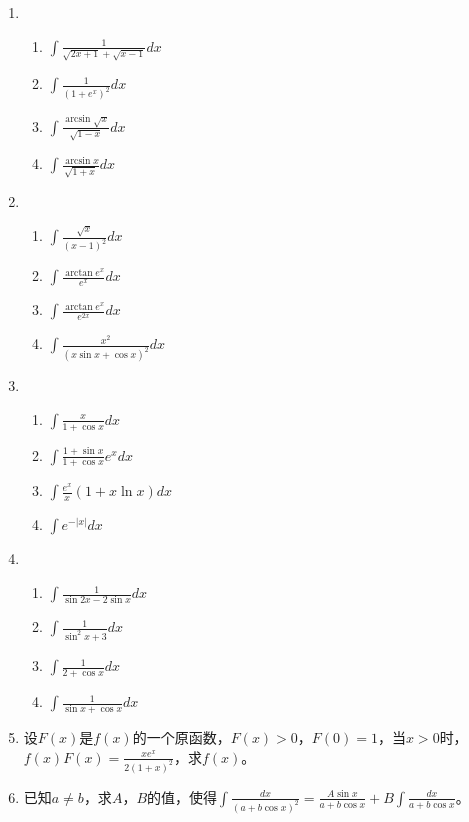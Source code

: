 \begin{enumerate}[{例}1.]
    \item   \begin{enumerate}[(1)]
                \item $\int \frac{1}{\sqrt{2x+1}+\sqrt{x-1}}dx$
                \item $\int \frac{1}{(1+e^x)^2}dx$
                \item $\int \frac{\arcsin \sqrt{x}}{\sqrt{1-x}}dx$
                \item $\int \frac{\arcsin x}{\sqrt{1+x}}dx$
            \end{enumerate}
    \item   \begin{enumerate}[(1)]
                \item $\int \frac{\sqrt{x}}{(x-1)^2}dx$
                \item $\int \frac{\arctan e^x}{e^x}dx$
                \item $\int \frac{\arctan e^x}{e^{2x}}dx$
                \item $\int \frac{x^2}{(x\sin x+ \cos x)^2}dx$
            \end{enumerate}
    \item   \begin{enumerate}[(1)]
                \item $\int \frac{x}{1+\cos x}dx$
                \item $\int \frac{1+\sin x}{1+\cos x}e^xdx$
                \item $\int \frac{e^x}{x}(1+x\ln x)dx$
                \item $\int e^{-\left|x\right|}dx$
            \end{enumerate}
    \item   \begin{enumerate}[(1)]
                \item $\int \frac{1}{\sin 2x - 2 \sin x}dx$
                \item $\int \frac{1}{\sin^2 x+3}dx$
                \item $\int \frac{1}{2+\cos x}dx$
                \item $\int \frac{1}{\sin x+\cos x}dx$
            \end{enumerate}
    \item 设$F(x)$是$f(x)$的一个原函数，$F(x)>0$，$F(0)=1$，当$x>0$时，$f(x)F(x)=\frac{xe^x}{2(1+x)^2}$，求$f(x)$。
    \item 已知$a\neq b$，求$A$，$B$的值，使得$\int \frac{dx}{(a+b\cos x)^2}=\frac{A\sin x}{a+b\cos x}+B\int \frac{dx}{a + b\cos x}$。
\end{enumerate}
